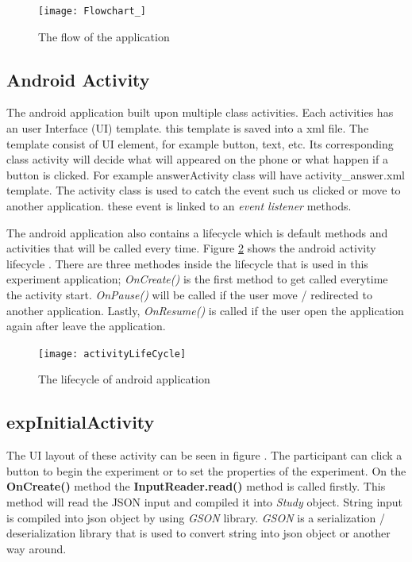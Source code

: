 \begin{figure}
\begin{center}
\texttt{[image: Flowchart\_]}
\end{center}
\centering
\captionsetup{justification=centering}
\caption{The flow of the application}
\label{fig:flowOfApplication}
\end{figure}

\subsection{Android Activity}
The android application built upon multiple class activities.
Each activities has an user Interface (UI) template. this template is saved into a xml file. The template consist of UI element, for example button, text, etc.
Its corresponding class activity will decide what will appeared on the phone or what happen if a button is clicked.
For example answerActivity class will have activity\_answer.xml template.
The activity class is used to catch the event such us clicked or move to another application. these event is linked to an \textit{event listener} methods.

The android application also contains a lifecycle which is  default methods and activities that will be called every time.
Figure \ref{fig:theLifeCycleOfActivity} shows the android activity lifecycle \citep{androidActivity}.
There are three methodes inside the lifecycle that is used in this experiment application;
 \textit{OnCreate()} is the first method to get called everytime the activity start.
 \textit{OnPause()} will be called if the user move / redirected to another application.
 Lastly,  \textit{OnResume()} is called if the user open the application again after leave the application.

\begin{figure}[!tbh]
\begin{center}
\texttt{[image: activityLifeCycle]}
\end{center}
\centering
\captionsetup{justification=centering}
\caption{The lifecycle of android application}
\label{fig:theLifeCycleOfActivity}
\end{figure}



\subsection{expInitialActivity}
The UI layout of these activity can be seen in figure .
The participant can click a button to begin the experiment or to set the properties of the experiment.
On the \textbf{OnCreate()} method the \textbf{InputReader.read()} method is called firstly.
This method will read the JSON input and compiled it into \textit{Study} object.
String input is compiled into json object by using \textit{GSON} library.
\textit{GSON} is a serialization / deserialization library that is used to convert string into json object or another way around. \citep{gsonLib}

